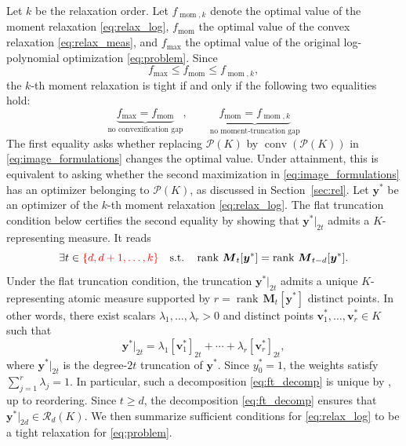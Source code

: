 \documentclass[pdflatex,sn-mathphys-num]{sn-jnl}%
\newcommand{\lmd}{\lambda}
\DeclareMathOperator{\rank}{rank}
\newcommand{\rd}[1]{{\color{red}#1}}
\newcommand{\vect}[1]{\boldsymbol{#1}}
\newcommand{\mat}[1]{\boldsymbol{#1}}
\newcommand{\ddd}{,\ldots,}
\theoremstyle{thmstyleone}%
\theoremstyle{thmstyletwo}%
\theoremstyle{thmstylethree}%
\begin{document}
Let $k$ be the relaxation order.
Let $f_{\operatorname{mom},k}$ denote the optimal value
of the moment relaxation \eqref{eq:relax_log},
$f_{\operatorname{mom}}$ the optimal value
of the convex relaxation \eqref{eq:relax_meas},
and $f_{\max}$ the optimal value of the
original log-polynomial optimization \eqref{eq:problem}.
Since
\[
f_{\max}\leq f_{\operatorname{mom}}
\leq f_{\operatorname{mom},k},
\]
\rd{the $k$-th moment relaxation is tight if and only if the following
two equalities hold:}
\[
\underbrace{f_{\max}=f_{\operatorname{mom}}}_{\text{no convexification gap}},
\qquad
\underbrace{f_{\operatorname{mom}}
=f_{\operatorname{mom},k}}_{\text{no moment-truncation gap}}
\]
\rd{The first equality asks whether replacing $\mathcal{P}(K)$ by
$\operatorname{conv}(\mathcal{P}(K))$ in
\eqref{eq:image_formulations} changes the optimal value. Under
attainment, this is equivalent to asking whether the second maximization
in \eqref{eq:image_formulations} has an optimizer belonging to
$\mathcal{P}(K)$, as discussed in Section~\ref{sec:rel}. Let
$\vect{y}^*$ be an optimizer of the $k$-th moment relaxation
\eqref{eq:relax_log}. The flat truncation condition below certifies the
second equality by showing that $\vect{y}^*|_{2t}$ admits a
$K$-representing measure.}
It reads
\begin{equation}\label{eq:flat_truncation}
	\exists t\in\rd{\{d,d+1,\ldots,k\}}\quad \mbox{s.t.}\quad
	\rank\,\mat{M}_t[\vect{y}^*] = \rank\,\mat{M}_{t-d}[\vect{y}^*].
\end{equation}
Under the flat truncation condition, \rd{the truncation
$\vect{y}^*|_{2t}$} admits a unique $K$-representing
atomic measure supported by $r=\rank\, \mat{M}_t[\vect{y}^*]$ distinct points.
In other words, \rd{there exist scalars
$\lmd_1,\ldots,\lmd_r>0$}
and distinct points $\vect{v}_1^* \ddd \vect{v}_r^* \in K$ such that
\begin{equation}\label{eq:ft_decomp}
	\vect{y}^*|_{2t} = \lmd_1 [\vect{v}_1^*]_{2t} + \cdots + \lmd_r [\vect{v}_r^*]_{2t},
\end{equation}
where $\vect{y}^*|_{2t}$ is \rd{the degree-$2t$ truncation} of $\vect{y}^*$.
\rd{Since $y_0^*=1$, the weights satisfy
$\sum_{j=1}^r\lambda_j=1$.}
In particular, such a decomposition \eqref{eq:ft_decomp} is unique by 
\cite[Theorem~2.7.7]{MPO}, up to reordering. 
Since $t\ge d$, the decomposition \eqref{eq:ft_decomp} ensures that 
$\vect{y}^*|_{2d}\in \mathscr{R}_d(K)$.
We then summarize sufficient conditions for \eqref{eq:relax_log} 
to be a tight relaxation for \eqref{eq:problem}.
\end{document}
